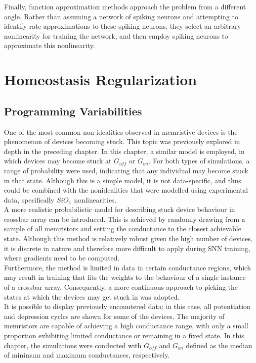 \noindent Finally, function approximation methods approach the problem from a different angle. Rather than assuming a network of spiking neurons and attempting to identify rate approximations to these spiking neurons, they select an arbitrary nonlinearity for training the network, and then employ spiking neurons to approximate this nonlinearity.


\section[Homeostasis Regularization]{Homeostasis Regularization}

\subsection{Programming Variabilities}

One of the most common non-idealities observed in memristive devices is the phenomenon of devices becoming stuck. This topic was previously explored in depth in the preceding chapter. In this chapter, a similar model is employed, in which devices may become stuck at $G_{off}$ or $G_{on}$. For both types of simulations, a range of probability were used, indicating that any individual may become stuck in that state. Although this is a simple model, it is not data-specific, and thus could be combined with the nonidealities that were modelled using experimental data, specifically $SiO_x$ nonlinearities.\\

\noindent A more realistic probabilistic model for describing stuck device behaviour in crossbar array can be introduced. This is achieved by randomly drawing from a sample of all memristors and setting the conductance to the closest achievable state. Although this method is relatively robust given the high number of devices, it is discrete in nature and therefore more difficult to apply during SNN training, where gradients need to be computed. \\

\noindent Furthermore, the method is limited in data in certain conductance regions, which may result in training that fits the weights to the behaviour of a single instance of a crossbar array. Consequently, a more continuous approach to picking the states at which the devices may get stuck in was adopted.\\

\noindent It is possible to display previously encountered data; in this case, all potentiation and depression cycles are shown for some of the devices. The majority of memristors are capable of achieving a high conductance range, with only a small proportion exhibiting limited conductance or remaining in a fixed state. In this chapter, the simulations were conducted with $G_{off}$ and $G_{on}$ defined as the median of minimum and maximum conductances, respectively. \\

